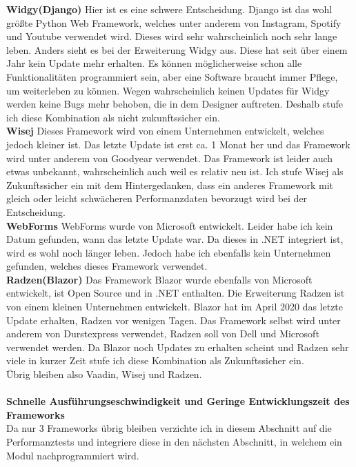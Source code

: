 \documentclass[ngerman]{article}
\begin{document}
    \indent\textbf{Widgy(Django)} Hier ist es eine schwere Entscheidung. Django ist das wohl größte Python Web Framework, welches unter anderem von Instagram, Spotify und Youtube verwendet wird. Dieses wird sehr wahrscheinlich noch sehr lange leben. Anders sieht es bei der Erweiterung Widgy aus. Diese hat seit über einem Jahr kein Update mehr erhalten. Es können möglicherweise schon alle Funktionalitäten programmiert sein, aber eine Software braucht immer Pflege, um weiterleben zu können. Wegen wahrscheinlich keinen Updates für Widgy werden keine Bugs mehr behoben, die in dem Designer auftreten. Deshalb stufe ich diese Kombination als nicht zukunftssicher ein.\\
    \indent\textbf{Wisej} Dieses Framework wird von einem Unternehmen entwickelt, welches jedoch kleiner ist. Das letzte Update ist erst ca. 1 Monat her und das Framework wird unter anderem von Goodyear verwendet. Das Framework ist leider auch etwas unbekannt, wahrscheinlich auch weil es relativ neu ist. Ich stufe Wisej als Zukunftssicher ein mit dem Hintergedanken, dass ein anderes Framework mit gleich oder leicht schwächeren Performanzdaten bevorzugt wird bei der Entscheidung.\\
    \indent\textbf{WebForms} WebForms wurde von Microsoft entwickelt. Leider habe ich kein Datum gefunden, wann das letzte Update war. Da dieses in .NET integriert ist, wird es wohl noch länger leben. Jedoch habe ich ebenfalls kein Unternehmen gefunden, welches dieses Framework verwendet.\\
    \indent\textbf{Radzen(Blazor)} Das Framework Blazor wurde ebenfalls von Microsoft entwickelt, ist Open Source und in .NET enthalten. Die Erweiterung Radzen ist von einem kleinen Unternehmen entwickelt. Blazor hat im April 2020 das letzte Update erhalten, Radzen vor wenigen Tagen. Das Framework selbst wird unter anderem von Durstexpress verwendet, Radzen soll von Dell und Microsoft verwendet werden. Da Blazor noch Updates zu erhalten scheint und Radzen sehr viele in kurzer Zeit stufe ich diese Kombination als Zukunftssicher ein.\\
    Übrig bleiben also Vaadin, Wisej und Radzen.\\\\
    \textbf{Schnelle Ausführungseschwindigkeit und Geringe Entwicklungszeit des Frameworks}\\
    Da nur 3 Frameworks übrig bleiben verzichte ich in diesem Abschnitt auf die Performanztests und integriere diese in den nächsten Abschnitt, in welchem ein Modul nachprogrammiert wird.
    \newpage\noindent
\end{document}
